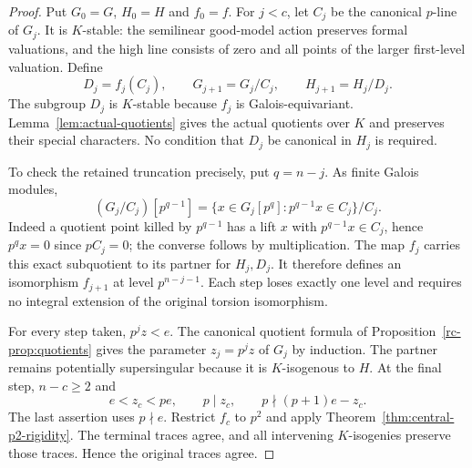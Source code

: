 \begin{proof}
Put $G_0=G$, $H_0=H$ and $f_0=f$. For $j<c$, let $C_j$ be the canonical $p$-line of $G_j$. It is $K$-stable: the semilinear good-model action preserves formal valuations, and the high line consists of zero and all points of the larger first-level valuation. Define
\[
 D_j=f_j(C_j),\qquad
 G_{j+1}=G_j/C_j,\qquad H_{j+1}=H_j/D_j.
\]
The subgroup $D_j$ is $K$-stable because $f_j$ is Galois-equivariant. Lemma~\ref{lem:actual-quotients} gives the actual quotients over $K$ and preserves their special characters. No condition that $D_j$ be canonical in $H_j$ is required.

To check the retained truncation precisely, put $q=n-j$. As finite Galois modules,
\begin{equation}\label{ci-eq:transport}
 (G_j/C_j)[p^{q-1}]
 =\{x\in G_j[p^q]:p^{q-1}x\in C_j\}/C_j.
\end{equation}
Indeed a quotient point killed by $p^{q-1}$ has a lift $x$ with $p^{q-1}x\in C_j$, hence $p^qx=0$ since $pC_j=0$; the converse follows by multiplication. The map $f_j$ carries this exact subquotient to its partner for $H_j,D_j$. It therefore defines an isomorphism $f_{j+1}$ at level $p^{n-j-1}$. Each step loses exactly one level and requires no integral extension of the original torsion isomorphism.

For every step taken, $p^jz<e$. The canonical quotient formula of Proposition~\ref{rc-prop:quotients} gives the parameter $z_j=p^jz$ of $G_j$ by induction. The partner remains potentially supersingular because it is $K$-isogenous to $H$. At the final step, $n-c\ge2$ and
\[
 e<z_c<pe,\qquad p\mid z_c,
 \qquad p\nmid (p+1)e-z_c.
\]
The last assertion uses $p\nmid e$. Restrict $f_c$ to $p^2$ and apply Theorem~\ref{thm:central-p2-rigidity}. The terminal traces agree, and all intervening $K$-isogenies preserve those traces. Hence the original traces agree.
\end{proof}

